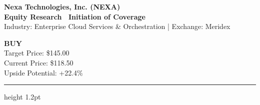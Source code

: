 \documentclass[10pt,titlepage]{article}
\begin{document}
\thispagestyle{firstpage}

\noindent
\begin{minipage}[t]{0.68\textwidth}
  \vspace{0pt}
  {\fontsize{22}{26}\selectfont\color{primaryblue}\bfseries Nexa Technologies, Inc. (NEXA)}\\[4pt]
  {\fontsize{11}{13}\selectfont\color{accentgold}\bfseries Equity Research \textbullet\ Initiation of Coverage}\\[4pt]
  {\small\color{charcoal} Industry: Enterprise Cloud Services \& Orchestration \quad | \quad Exchange: Meridex}
\end{minipage}%
\hfill
\begin{minipage}[t]{0.28\textwidth}
  \vspace{0pt}
  \begin{tcolorbox}[
    colback=buygreen,
    colframe=buygreen,
    arc=4pt,
    boxrule=0.5pt,
    left=4pt, right=4pt, top=4pt, bottom=4pt,
    width=\linewidth,
    halign=center
  ]
    {\color{white}\bfseries\large BUY}\\[2pt]
    {\color{white}\fontsize{9}{11}\selectfont Target Price: \$145.00}\\[1pt]
    {\color{white}\fontsize{8}{10}\selectfont Current Price: \$118.50}\\[1pt]
    {\color{white}\fontsize{8}{10}\selectfont Upside Potential: +22.4\%}
  \end{tcolorbox}
\end{minipage}

\vspace{6pt}
\hrule height 1.2pt\relax
\vspace{8pt}
\end{document}
